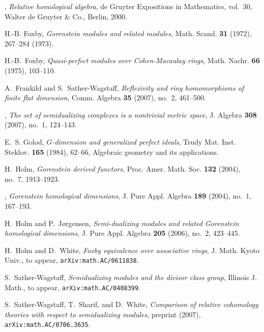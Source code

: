\documentclass{amsart}
\begin{document}
\begin{thebibliography}{10}
\bysame, \emph{Relative homological algebra}, de Gruyter Expositions in
  Mathematics, vol.~30, Walter de Gruyter \& Co., Berlin, 2000. 

H.-B. Foxby, \emph{Gorenstein modules and related modules}, Math. Scand.
  \textbf{31} (1972), 267--284 (1973). 

H.-B.\ Foxby, \emph{Quasi-perfect modules over {C}ohen-{M}acaulay rings}, Math.
  Nachr. \textbf{66} (1975), 103--110. 

A.~Frankild and S.~Sather-Wagstaff, \emph{Reflexivity and ring homomorphisms of
  finite flat dimension}, Comm. Algebra \textbf{35} (2007), no.~2, 461--500.

\bysame, \emph{The set of semidualizing complexes is a nontrivial metric
  space}, J. Algebra \textbf{308} (2007), no.~1, 124--143. 

E.~S. Golod, \emph{{$G$}-dimension and generalized perfect ideals}, Trudy Mat.
  Inst. Steklov. \textbf{165} (1984), 62--66, Algebraic geometry and its
  applications. 

H.~Holm, \emph{Gorenstein derived functors}, Proc. Amer. Math. Soc.
  \textbf{132} (2004), no.~7, 1913--1923. 

\bysame, \emph{Gorenstein homological dimensions}, J. Pure Appl. Algebra
  \textbf{189} (2004), no.~1, 167--193. 

H.~Holm and P.~J{\o}rgensen, \emph{Semi-dualizing modules and related
  {G}orenstein homological dimensions}, J. Pure Appl. Algebra \textbf{205}
  (2006), no.~2, 423--445. 

H.~Holm and D.~White, \emph{{Foxby equivalence over associative rings}}, J.
  Math. Kyoto Univ., to appear, \texttt{arXiv:math.AC/0611838}.

S.~Sather-Wagstaff, \emph{Semidualizing modules and the divisor class group},
  Illinois J. Math., to appear, \texttt{arXiv:math.AC/0408399}.

S.~Sather-Wagstaff, T.~Sharif, and D.~White, \emph{Comparison of relative
  cohomology theories with respect to semidualizing modules}, preprint (2007),
  \texttt{arXiv:math.AC/0706.3635}.


\end{thebibliography}
\end{document}
